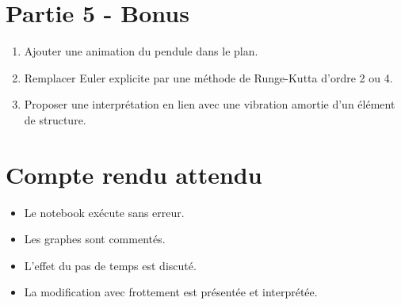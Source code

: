 \section*{Partie 5 - Bonus}
\begin{enumerate}
    \item Ajouter une animation du pendule dans le plan.

    \item Remplacer Euler explicite par une méthode de Runge-Kutta d'ordre 2 ou 4.

    \item Proposer une interprétation en lien avec une vibration amortie d'un élément de structure.
\end{enumerate}

\section*{Compte rendu attendu}
\begin{itemize}
    \item Le notebook exécute sans erreur.
    \item Les graphes sont commentés.
    \item L'effet du pas de temps est discuté.
    \item La modification avec frottement est présentée et interprétée.
\end{itemize}


